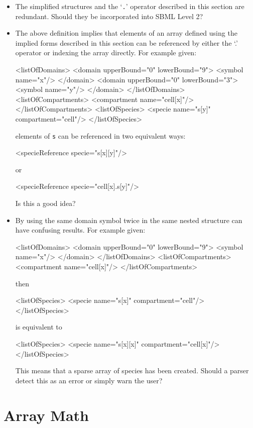\documentclass{cekarticle}
\begin{document}
\begin{itemize}
\item
The simplified structures and the `\texttt{.}' operator
described in this section are redundant.  Should they be
incorporated into SBML Level 2?
\item
The above definition implies that elements of an array defined using the implied forms
described in this section can be referenced by either the `.' operator or indexing the array directly.
For example given:
\begin{example}
<listOfDomains>
    <domain upperBound="0" lowerBound="9">
        <symbol name="x"/>
    </domain>
    <domain upperBound="0" lowerBound="3">
        <symbol name="y"/>
    </domain>
</listOfDomains>
<listOfCompartments>
    <compartment name="cell[x]"/>
</listOfCompartments>
<listOfSpecies>
    <specie name="s[y]" compartment="cell"/>
</listOfSpecies>
\end{example}
elements of \texttt{s} can be referenced in two equivalent ways:
\begin{example}
<specieReference specie="s[x][y]"/>
\end{example}
or
\begin{example}
<specieReference specie="cell[x].s[y]"/>
\end{example}

Is this a good idea?

\item
By using the same domain symbol twice in the same nested structure can have confusing results.
For example given:
\begin{example}
<listOfDomains>
    <domain upperBound="0" lowerBound="9">
        <symbol name="x"/>
    </domain>
</listOfDomains>
<listOfCompartments>
    <compartment name="cell[x]"/>
</listOfCompartments>
\end{example}
then
\begin{example}
<listOfSpecies>
    <specie name="s[x]" compartment="cell"/>
</listOfSpecies>
\end{example}
is equivalent to
\begin{example}
<listOfSpecies>
    <specie name="s[x][x]" compartment="cell[x]"/>
</listOfSpecies>
\end{example}

This means that a sparse array of species has been created.
Should a parser detect this as an error or simply warn the user?
\end{itemize}

\section{Array Math}
\label{sec:math}
\end{document}
